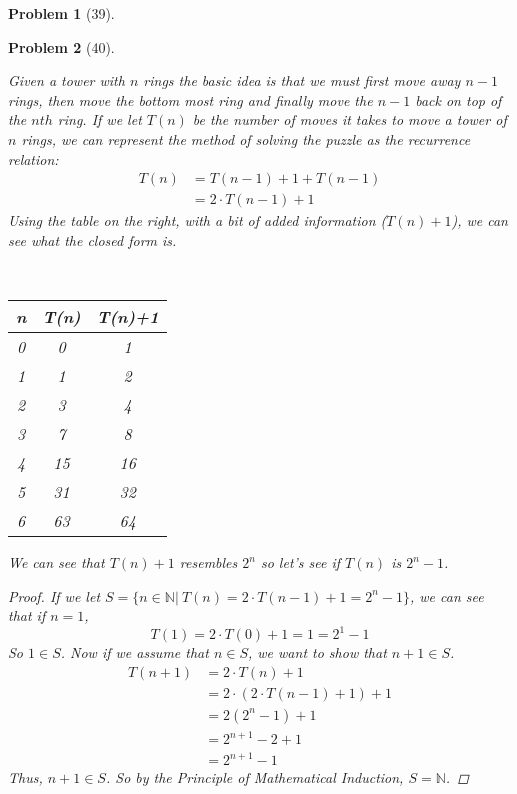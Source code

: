 \documentclass{article}
\theoremstyle{problem}
\newtheorem{prob}{Problem}
\theoremstyle{plain}
\begin{document}
\begin{prob}[39]
\begin{enumerate}[a)]
  \end{enumerate}
\end{prob}

\begin{prob}[40]
  \begin{multicols}{2}
    Given a tower with $n$ rings the basic idea is that we must first move away $n-1$ rings, then move the bottom most ring and finally move the $n-1$ back on top of the $nth$ ring. If we let $T(n)$ be the number of moves it takes to move a tower of $n$ rings, we can represent the method of solving the puzzle as the recurrence relation:
\begin{align*}
T(n) &= T(n-1) + 1 + T(n - 1)\\
     &= 2\cdot T(n - 1) + 1
\end{align*}
Using the table on the right, with a bit of added information ($T(n)+1$), we can see what the closed form is.
    \vfill
    \columnbreak
    \begin{center}\ \\[1cm]
      \begin{tabular}{c|c c}
        n & T(n) & T(n)+1\\
        \hline
        0 & 0 & 1\\
        1 & 1 & 2\\
        2 & 3 & 4\\
        3 & 7 & 8\\
        4 & 15& 16\\
        5 & 31& 32\\
        6 & 63& 64
      \end{tabular}
  \end{center}
\end{multicols}
  We can see that $T(n) + 1$ resembles $2^n$ so let's see if $T(n)$ is $2^n - 1$. 
\begin{proof}
If we let $S = \{n \in \mathbb{N}|\ T(n) = 2\cdot T(n-1) + 1 = 2^n -1\}$, we can see that if $n = 1$,
$$
  T(1) = 2\cdot T(0) +1 = 1 = 2^1 - 1
$$
So $1 \in S$. Now if we assume that $n \in S$, we want to show that $n + 1 \in S$.
\begin{align*}
  T(n+1) &= 2\cdot T(n) + 1\\
         &= 2\cdot (2\cdot T(n-1) + 1) + 1\\
         &= 2 (2^n - 1) + 1\\
         &= 2^{n+1} - 2 + 1\\
         &= 2^{n+1} - 1
\end{align*}
Thus, $n + 1 \in S$. So by the Principle of Mathematical Induction, $S = \mathbb{N}$.
\end{proof}
\end{prob}
\end{document}
